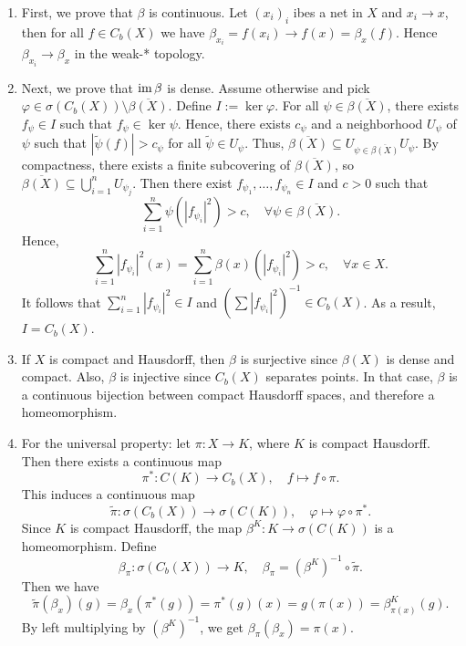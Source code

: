 \begin{myproof}
  \begin{enumerate}
    \item First, we prove that $\beta$ is continuous. Let $(x_i)_i$ ibes a net in $X$ and $x_i \to x$,
    then for all $f \in C_b (X)$ we have $\beta_{x_i} = f(x_i) \to f(x) = \beta_x (f)$.
    Hence $\beta_{x_i} \to \beta_x$ in the weak-* topology.
    \item Next, we prove that $\operatorname{im} \beta$ is dense. Assume otherwise and pick $\varphi \in \sigma(C_b (X)) \setminus \overline{\beta (X)}$.
    Define $I := \ker \varphi$. For all $\psi \in \overline{\beta (X)}$, there exists $f_{\psi} \in I$ such that $f_{\psi} \in \ker \psi$.
    Hence, there exists $c_\psi$ and a neighborhood $U_{\psi}$ of $\psi$ such that $| \widetilde{\psi} (f)| > c_{\psi}$ for all $\widetilde{\psi} \in U_{\psi}$.
    Thus, $\overline{\beta (X)} \subseteq U_{\psi \in \overline{\beta (X)}} U_{\psi}$.
    By compactness, there exists a finite subcovering of $\overline{\beta (X)}$, so $\overline{\beta (X)} \subseteq \bigcup_{i = 1} ^n U_{\psi_j}$.
    Then there exist $f_{\psi_1}, \dots, f_{\psi_n} \in I$ and $c > 0$ such that 
    $$\sum_{i = 1} ^n \psi (|f_{\psi_i}|^2) > c,\quad \forall \psi \in \overline{\beta (X)}.$$
    Hence, $$\sum_{i = 1} ^n |f_{\psi_i}|^2 (x) = \sum_{i = 1} ^n \beta (x) (|f_{\psi_i}|^2) > c,\quad \forall x \in X.$$
    It follows that $\sum_{i = 1} ^n |f_{\psi_i} |^2 \in I$ and $(\sum |f_{\psi_i}|^2)^{-1} \in C_b (X)$. As a result, $I = C_b (X)$.
    \item If $X$ is compact and Hausdorff, then $\beta$ is surjective since $\beta (X)$ is dense and compact.
    Also, $\beta$ is injective since $C_b (X)$ separates points. In that case, $\beta$ is a continuous bijection between compact Hausdorff spaces, and therefore a homeomorphism.
    \item For the universal property: let $\pi: X \to K$, where $K$ is compact Hausdorff.
    Then there exists a continuous map $$\pi^*: C(K) \rightarrow C_b (X),\quad f \mapsto f \circ \pi.$$
    This induces a continuous map 
    $$\widetilde{\pi}: \sigma(C_b (X)) \to \sigma (C(K)),\quad \varphi \mapsto \varphi \circ \pi^*.$$
    Since $K$ is compact Hausdorff, the map $\beta^K : K \to \sigma(C(K))$ is a homeomorphism.
    Define $$\beta_\pi: \sigma(C_b (X)) \to K,\quad \beta_{\pi} = (\beta^K)^{-1} \circ \widetilde{\pi}.$$
    Then we have 
    $$\widetilde{\pi} (\beta_x) (g) = \beta_x (\pi^* (g)) = \pi^* (g) (x) = g(\pi(x)) = \beta_{\pi(x)} ^K (g).$$
    By left multiplying by $(\beta^K)^{-1}$, we get $\beta_{\pi} (\beta_x) = \pi (x)$. \qedhere
  \end{enumerate}
\end{myproof}

